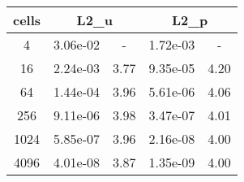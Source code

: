 \documentclass[10pt]{report}
\begin{document}
\begin{table}[H]
\begin{center}
\begin{tabular}{|c|c|c|c|c|} \hline
cells & 
\multicolumn{2}{|c|}{L2_u} & 
\multicolumn{2}{|c|}{L2_p}\\ \hline
4 & 3.06e-02 & - & 1.72e-03 & -\\ \hline
16 & 2.24e-03 & 3.77 & 9.35e-05 & 4.20\\ \hline
64 & 1.44e-04 & 3.96 & 5.61e-06 & 4.06\\ \hline
256 & 9.11e-06 & 3.98 & 3.47e-07 & 4.01\\ \hline
1024 & 5.85e-07 & 3.96 & 2.16e-08 & 4.00\\ \hline
4096 & 4.01e-08 & 3.87 & 1.35e-09 & 4.00\\ \hline
\end{tabular}
\end{center}
\end{table}
\end{document}
